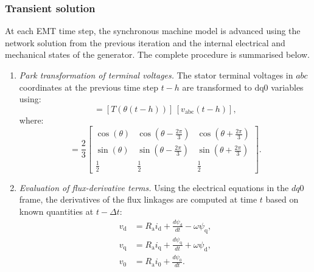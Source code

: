 \subsubsection{Transient solution}

At each EMT time step, the synchronous machine model is advanced using the network solution from the previous
iteration and the internal electrical and mechanical states of the generator. The complete procedure is summarised below.

\begin{enumerate}
    \item \textit{Park transformation of terminal voltages.}  
    The stator terminal voltages in $abc$ coordinates at the previous time step $t-h$ are transformed to $\text{dq0}$ variables using:
    \begin{equation}
        [v_{\text{dq0}}(t-h)] = [T(\theta(t-h))] \, [v_{\text{abc}}(t-h)],
    \end{equation}
    where:
    \begin{equation}
    [T(\theta)] =
    \frac{2}{3}
    \begin{bmatrix}
    \cos(\theta)                & \cos(\theta - \tfrac{2\pi}{3}) & \cos(\theta + \tfrac{2\pi}{3}) \\[6pt]
    \sin(\theta)                & \sin(\theta - \tfrac{2\pi}{3}) & \sin(\theta + \tfrac{2\pi}{3}) \\[6pt]
    \tfrac{1}{2}                & \tfrac{1}{2}                   & \tfrac{1}{2}
    \end{bmatrix}.
    \end{equation}

    \item \textit{Evaluation of flux-derivative terms.}  
    Using the electrical equations in the $dq0$ frame, the derivatives of the flux linkages are computed at time $t$ based on known quantities at $t-\Delta t$:
    \begin{equation}
    \begin{aligned}
    v_\text{d} &= R_\text{a} i_\text{d} + \frac{d\psi_\text{d}}{dt} - \omega \psi_\text{q}, \\[4pt]
    v_\text{q} &= R_\text{a} i_\text{q} + \frac{d\psi_\text{q}}{dt} + \omega \psi_\text{d}, \\[4pt]
    v_\text{0} &= R_\text{a} i_\text{0} + \frac{d\psi_\text{0}}{dt}.
    \end{aligned}
    \end{equation}


\end{enumerate}
